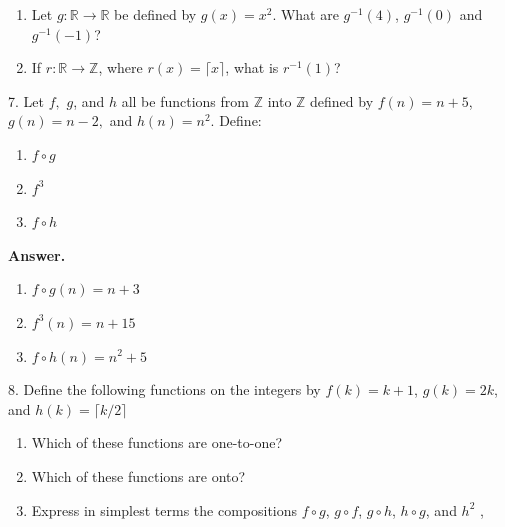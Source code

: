 \documentclass[10pt,]{book}
\theoremstyle{plain}
\theoremstyle{definition}
\theoremstyle{definition}
\theoremstyle{definition}
\begin{document}
\begin{exercisegroup}
\leavevmode%
\begin{enumerate}[label=\alph*]
\item\hypertarget{li-90}{} Let \(g : \mathbb{R} \to  \mathbb{R}\) be defined by \(g(x) = x^2\). What are \(g^{-1}(4)\), \(g^{-1}(0)\) and \(g^{-1}(-1)\)?%
\item\hypertarget{li-91}{} If \(r: \mathbb{R}\to \mathbb{Z}\), where \(r(x) = \lceil x\rceil\),  what is \(r^{-1}(1)\)?%
\end{enumerate}
%
\par\smallskip
\item[7.]\hypertarget{exercise-29}{} Let \( f,\)  \(g\), and \(h\) all be functions from \(\mathbb{Z}\) into \(\mathbb{Z}\) defined by \(f(n) = n + 5\), \(g(n) = n - 2,\)
and \(h(n)=n^2\). Define:%
\par
\leavevmode%
\begin{enumerate}[label=\alph*]
\item\hypertarget{li-92}{} \(f\circ g\)%
\item\hypertarget{li-93}{} \(f^3\)%
\item\hypertarget{li-94}{} \(f\circ h\)%
\end{enumerate}
%
\par\smallskip
\par\smallskip
\noindent\textbf{Answer.}\hypertarget{answer-13}{}\quad
\leavevmode%
\begin{multicols}{3}
\begin{enumerate}[label=\alph*]
\item\hypertarget{li-95}{} \(f\circ g(n)=n+3\)%
\item\hypertarget{li-96}{} \(f^3(n)=n+15\)   %
\item\hypertarget{li-97}{} \(f\circ h(n)=n^2+5\) %
\end{enumerate}
\end{multicols}
%
\item[8.]\hypertarget{exercise-30}{}Define the following functions on the integers by \(f(k) = k + 1\), \(g(k) = 2k\), and \(h(k)=\lceil k/2\rceil\) %
\par
\leavevmode%
\begin{enumerate}[label=\alph*]
\item\hypertarget{li-98}{} Which of these functions are one-to-one?%
\item\hypertarget{li-99}{} Which of these functions are onto?%
\item\hypertarget{li-100}{} Express in simplest terms the compositions \(f\circ g\), \(g \circ f\), \(g \circ  h\), \(h \circ  g\), and \(h^2\) ,%

\end{enumerate}
\end{exercisegroup}
\end{document}
